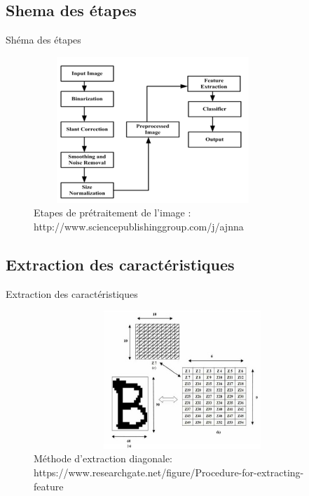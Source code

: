 \documentclass{beamer}
\begin{document}
\subsection{Shema des étapes}
\begin{frame}{Shéma des étapes} 
\begin{figure}[H]
    \includegraphics[width=9cm,height=5.5cm]{images/pretraitement.png}
    \caption{Etapes de prétraitement de l’image : http://www.sciencepublishinggroup.com/j/ajnna}
    \label{fig:L1}
\end{figure}
\end{frame}
\subsection{Extraction des caractéristiques}
\begin{frame}{Extraction des caractéristiques} 
\begin{figure}[H]
    \includegraphics[width=12cm,height=5.2cm]{images/diagonal_methode.png}
    \caption{Méthode d'extraction diagonale: https://www.researchgate.net/figure/Procedure-for-extracting-feature}
    \label{fig:L1}
\end{figure}
\end{frame}
\end{document}
